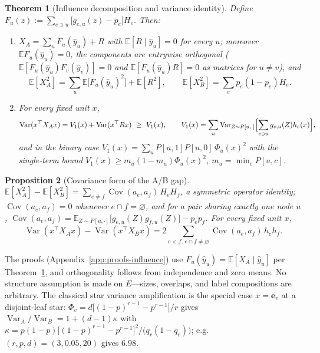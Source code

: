 \documentclass[preprint,11pt]{elsarticle}
\newtheorem{theorem}{Theorem}[section]
\newtheorem{proposition}[theorem]{Proposition}
\begin{document}
\begin{theorem}[Influence decomposition and variance identity]
\label{thm:decomp}
Define $F_u(z):=\sum_{e\ni u}\bigl[g_{e,u}(z)-p_e\bigr]H_e$. Then:
\begin{enumerate}
\item[\textup{(i)}] $X_A=\sum_uF_u(\hat y_u)+R$ with $\mathbb
E[R\mid\hat y_u]=0$ for every $u$; moreover $\mathbb EF_u(\hat y_u)=0$,
the components are entrywise orthogonal
($\mathbb E[F_u(\hat y_u)F_v(\hat y_v)]=0$ and $\mathbb E[F_u(\hat
y_u)R]=0$ as matrices for $u\ne v$), and
\[
\mathbb E[X_A^2]=\sum_u\mathbb E\bigl[F_u(\hat y_u)^2\bigr]+\mathbb E[R^2],
\qquad
\mathbb E[X_B^2]=\sum_ep_e(1-p_e)H_e .
\]
\item[\textup{(ii)}] For every fixed unit $x$,
\[
\operatorname{Var}(x^\top X_Ax)=V_1(x)+\operatorname{Var}(x^\top Rx)
\ \ge\ V_1(x),\qquad
V_1(x)=\sum_u\operatorname{Var}_{Z\sim P[u,\cdot]}
\Bigl[\sum_{e\ni u}g_{e,u}(Z)h_e(x)\Bigr],
\]
and in the binary case $V_1(x)=\sum_uP[u,1]P[u,0]\,\Phi_u(x)^2$ with
the single-term bound
$V_1(x)\ge m_u(1-m_u)\Phi_u(x)^2$, $m_u=\min_cP[u,c]$.
\end{enumerate}
\end{theorem}

\begin{proposition}[Covariance form of the A/B gap]\label{prop:cov}
$\mathbb E[X_A^2]-\mathbb E[X_B^2]
=\sum_{e\ne f}\operatorname{Cov}(a_e,a_f)\,H_eH_f$, a symmetric
operator identity; $\operatorname{Cov}(a_e,a_f)=0$ whenever
$e\cap f=\varnothing$, and for a pair sharing exactly one node $u$,
$\operatorname{Cov}(a_e,a_f)
=\mathbb E_{Z\sim P[u,\cdot]}\bigl[g_{e,u}(Z)g_{f,u}(Z)\bigr]-p_ep_f$.
For every fixed unit $x$,
\[
\operatorname{Var}(x^\top X_Ax)-\operatorname{Var}(x^\top X_Bx)
=2\!\!\sum_{e<f,\,e\cap f\ne\varnothing}\!\!
\operatorname{Cov}(a_e,a_f)\,h_eh_f .
\]
\end{proposition}

The proofs (Appendix~\ref{app:proofs-influence}) use
$F_u(\hat y_u)=\mathbb E[X_A\mid\hat y_u]$ per
Theorem~\ref{thm:decomp},
and orthogonality follows from independence and zero means. No
structure assumption is made on $E$---sizes, overlaps, and label
compositions are arbitrary. The classical star variance amplification
is the special case $x=\mathbf e_v$ at a disjoint-leaf
star: $\Phi_v=d\bigl[(1-p)^{r-1}-p^{r-1}\bigr]/r$ gives
$\operatorname{Var}_A/\operatorname{Var}_B=1+(d-1)\kappa$ with
$\kappa=p(1-p)\bigl[(1-p)^{r-1}-p^{r-1}\bigr]^2/\bigl(q_r(1-q_r)\bigr)$;
e.g.\ $(r,p,d)=(3,0.05,20)$ gives $6.98$.
\end{document}
